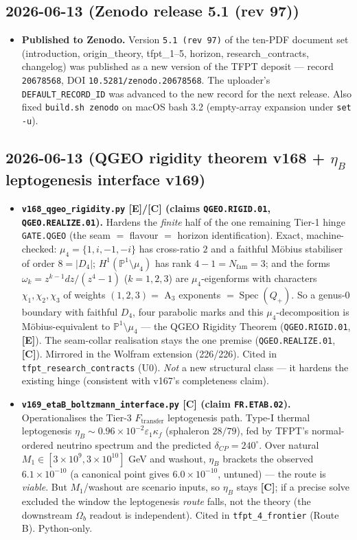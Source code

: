 \documentclass[11pt]{article}
\providecommand{\mE}{\textbf{[E]}}\providecommand{\mC}{\textbf{[C]}}
\begin{document}
\subsection*{2026-06-13 (Zenodo release 5.1 (rev 97))}
\begin{itemize}
\item \textbf{Published to Zenodo.} Version \texttt{5.1 (rev 97)} of the ten-PDF document set
  (introduction, origin\_theory, tfpt\_1--5, horizon, research\_contracts, changelog) was
  published as a new version of the TFPT deposit --- record \texttt{20678568},
  DOI \texttt{10.5281/zenodo.20678568}. The uploader's \texttt{DEFAULT\_RECORD\_ID} was advanced
  to the new record for the next release. Also fixed \texttt{build.sh zenodo} on macOS bash 3.2
  (empty-array expansion under \texttt{set -u}).
\end{itemize}

\subsection*{2026-06-13 (QGEO rigidity theorem v168 + $\eta_B$ leptogenesis interface v169)}
\begin{itemize}
\item \textbf{\texttt{v168\_qgeo\_rigidity.py} \mE/\mC{} (claims \texttt{QGEO.RIGID.01},
  \texttt{QGEO.REALIZE.01}).} Hardens the \emph{finite} half of the one remaining Tier-1 hinge
  \texttt{GATE.QGEO} (the seam $=$ flavour $=$ horizon identification). Exact, machine-checked:
  $\mu_4=\{1,i,-1,-i\}$ has cross-ratio $2$ and a faithful M\"obius stabiliser of order $8=|D_4|$;
  $H^1(\mathbb P^1\!\setminus\!\mu_4)$ has rank $4-1=N_{\mathrm{fam}}=3$; and the forms
  $\omega_k=z^{k-1}dz/(z^4-1)$ ($k=1,2,3$) are $\mu_4$-eigenforms with characters
  $\chi_1,\chi_2,\chi_3$ of weights $(1,2,3)=$ A$_3$ exponents $=\operatorname{Spec}(Q_+)$. So a
  genus-0 boundary with faithful $D_4$, four parabolic marks and this $\mu_4$-decomposition is
  M\"obius-equivalent to $\mathbb P^1\!\setminus\!\mu_4$ --- the QGEO Rigidity Theorem
  (\texttt{QGEO.RIGID.01}, \mE). The seam-collar realisation stays the one premise
  (\texttt{QGEO.REALIZE.01}, \mC). Mirrored in the Wolfram extension (226/226). Cited in
  \texttt{tfpt\_research\_contracts} (U0). \emph{Not} a new structural class --- it hardens the
  existing hinge (consistent with v167's completeness claim).
\item \textbf{\texttt{v169\_etaB\_boltzmann\_interface.py} \mC{} (claim \texttt{FR.ETAB.02}).}
  Operationalises the Tier-3 $F_{\mathrm{transfer}}$ leptogenesis path. Type-I thermal
  leptogenesis $\eta_B\sim0.96\times10^{-2}\varepsilon_1\kappa_f$ (sphaleron $28/79$), fed by
  TFPT's normal-ordered neutrino spectrum and the predicted $\delta_{CP}=240^\circ$. Over natural
  $M_1\in[3\times10^9,3\times10^{10}]$ GeV and washout, $\eta_B$ brackets the observed
  $6.1\times10^{-10}$ (a canonical point gives $6.0\times10^{-10}$, untuned) --- the route is
  \emph{viable}. But $M_1$/washout are scenario inputs, so $\eta_B$ stays \mC; if a precise solve
  excluded the window the leptogenesis \emph{route} falls, not the theory (the downstream
  $\Omega_b$ readout is independent). Cited in \texttt{tfpt\_4\_frontier} (Route B). Python-only.
\end{itemize}
\end{document}
